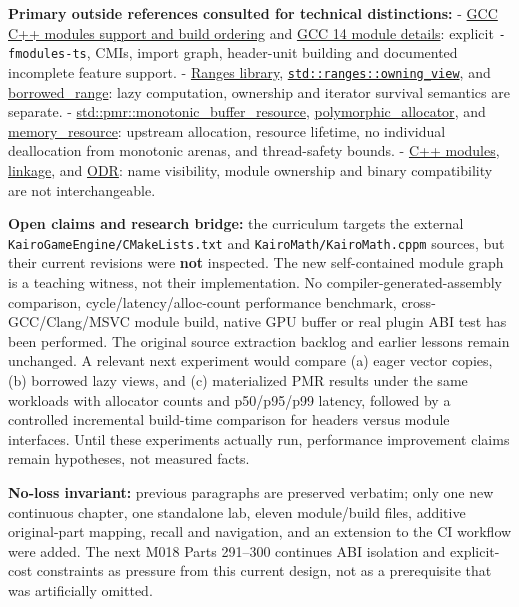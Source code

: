 \textbf{Primary outside references consulted for technical distinctions:} - \href{https://gcc.gnu.org/onlinedocs/gcc/C_002b_002b-Modules.html}{GCC C++ modules support and build ordering} and \href{https://gcc.gnu.org/onlinedocs/gcc-14.3.0/gcc/C_002b_002b-Modules.html}{GCC 14 module details}: explicit \texttt{-fmodules-ts}, CMIs, import graph, header-unit building and documented incomplete feature support. - \href{https://en.cppreference.com/cpp/ranges}{Ranges library}, \href{https://en.cppreference.com/cpp/ranges/owning_view}{\texttt{std::ranges::owning\_view}}, and \href{https://en.cppreference.com/w/cpp/ranges/borrowed_range}{borrowed\_range}: lazy computation, ownership and iterator survival semantics are separate. - \href{https://en.cppreference.com/cpp/memory/monotonic_buffer_resource}{std::pmr::monotonic\_buffer\_resource}, \href{https://en.cppreference.com/w/cpp/memory/polymorphic_allocator}{polymorphic\_allocator}, and \href{https://en.cppreference.com/w/cpp/memory/memory_resource}{memory\_resource}: upstream allocation, resource lifetime, no individual deallocation from monotonic arenas, and thread-safety bounds. - \href{https://en.cppreference.com/w/cpp/language/modules}{C++ modules}, \href{https://en.cppreference.com/w/cpp/language/storage_duration}{linkage}, and \href{https://en.cppreference.com/w/cpp/language/definition}{ODR}: name visibility, module ownership and binary compatibility are not interchangeable.

\textbf{Open claims and research bridge:} the curriculum targets the external \texttt{KairoGameEngine/CMakeLists.txt} and \texttt{KairoMath/KairoMath.cppm} sources, but their current revisions were \textbf{not} inspected. The new self-contained module graph is a teaching witness, not their implementation. No compiler-generated-assembly comparison, cycle/latency/alloc-count performance benchmark, cross-GCC/Clang/MSVC module build, native GPU buffer or real plugin ABI test has been performed. The original source extraction backlog and earlier lessons remain unchanged. A relevant next experiment would compare (a) eager vector copies, (b) borrowed lazy views, and (c) materialized PMR results under the same workloads with allocator counts and p50/p95/p99 latency, followed by a controlled incremental build-time comparison for headers versus module interfaces. Until these experiments actually run, performance improvement claims remain hypotheses, not measured facts.

\textbf{No-loss invariant:} previous paragraphs are preserved verbatim; only one new continuous chapter, one standalone lab, eleven module/build files, additive original-part mapping, recall and navigation, and an extension to the CI workflow were added. The next M018 Parts 291--300 continues ABI isolation and explicit-cost constraints as pressure from this current design, not as a prerequisite that was artificially omitted.

